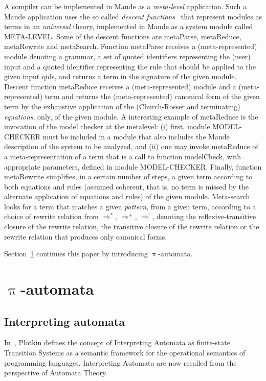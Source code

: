 \documentclass{llncs}%
\begin{document}
A compiler can be implemented in Maude as a \emph{meta-level} application. Such a Maude application uses the so called \emph{descent functions}~\cite[Ch.11]{maude} that represent modules as terms in an \emph{universal} theory, implemented in Maude as a system module called META-LEVEL. Some of the descent functions are metaParse, metaReduce, metaRewrite and metaSearch. Function metaParse receives a (meta-represented) module denoting a grammar, a set of quoted identifiers representing the (user) input and a quoted identifier representing the rule that should be applied to the given input qids, and returns a term in the signature of the given module. Descent function metaReduce receives a (meta-represented) module and a (meta-represented) term and returns the (meta-represented) canonical form of the given term by the exhaustive application of the (Church-Rosser and terminating) \emph{equations}, only, of the given module.  A interesting example of metaReduce is the invocation of the model checker at the metalevel: (i) first, module MODEL-CHECKER must be included in a module that also includes the Maude description of the system to be analyzed, and (ii) one may invoke metaReduce of a meta-representation of a term that is a call to function modelCheck, with appropriate parameters, defined in module MODEL-CHECKER. Finally, function metaRewrite simplifies, in a certain number of steps, a given term according to both equations and rules (assumed coherent, that is, no term is missed by the alternate application of equations and rules) of the given module. Meta-search looks for a term that matches a given \emph{pattern}, from a given term, according to a choice of rewrite relation from $\Rightarrow^*$, $\Rightarrow^+$, $\Rightarrow^!$, denoting the reflexive-transitive closure of the rewrite relation, the transitive closure of the rewrite relation or the rewrite relation that produces only canonical forms.

Section~\ref{sec:gia} continues this paper by introducing $\uppi$-automata.

\section{$\uppi$-automata}\label{sec:gia}

\subsection{Interpreting automata}

In~\cite{plotkin}, Plotkin defines the concept of Interpreting Automata as finite-state Transition Systems as a semantic framework for the operational semantics of programming languages. Interpreting Automata are now recalled from the perspective of Automata Theory.
\end{document}
